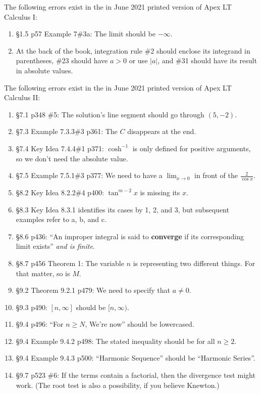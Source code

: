 \documentclass{amsart}
\begin{document}
The following errors exist in the in June 2021 printed version of Apex LT Calculus I:
\begin{enumerate}
\item \S1.5 p57 Example 7\#3a: The limit should be $-\infty$.
\item At the back of the book, integration rule \#2 should enclose its integrand in parentheses, \#23 should have $a>0$ or use $|a|$, and \#31 should have its result in absolute values.
\label{2021-06-00I}
\end{enumerate}

The following errors exist in the in June 2021 printed version of Apex LT Calculus II:
\begin{enumerate}
\item \S7.1 p348 \#5: The solution's line segment should go through $(5,-2)$.
\item \S7.3 Example 7.3.3\#3 p361: The $C$ disappears at the end.
\item \S7.4 Key Idea 7.4.4\#1 p371: $\cosh^{-1}$ is only defined for positive arguments, so we don't need the absolute value.
\item \S7.5 Example 7.5.1\#3 p377: We need to have a $\lim_{x\to 0}$ in front of the $\frac2{\cos x}$.
\item \S8.2 Key Idea 8.2.2\#4 p400: $\tan^{m-2}x$ is missing its $x$.
\item \S8.3 Key Idea 8.3.1 identifies its cases by 1, 2, and 3, but subsequent examples refer to a, b, and c.
\item \S8.6 p436: ``An improper integral is said to \textbf{converge} if its corresponding limit exists'' \emph{and is finite}.
\item \S8.7 p456 Theorem 1: The variable $n$ is representing two different things.  For that matter, so is $M$.
\item \S9.2 Theorem 9.2.1 p479: We need to specify that $a\neq 0$.
\item \S9.3 p490: $[n,\infty]$ should be $[n,\infty)$.
\item \S9.4 p496: ``For $n\ge N$, We're now'' should be lowercased.
\item \S9.4 Example 9.4.2 p498: The stated inequality should be for all $n\ge 2$.
\item \S9.4 Example 9.4.3 p500: ``Harmonic Sequence'' should be ``Harmonic Series''.
\item \S9.7 p523 \#6: If the terms contain a factorial, then the divergence test might work.  (The root test is also a possibility, if you believe Knewton.)

\end{enumerate}
\end{document}
